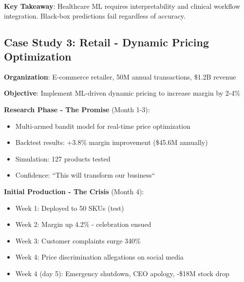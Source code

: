 \textbf{Key Takeaway}: Healthcare ML requires interpretability and clinical workflow integration. Black-box predictions fail regardless of accuracy.

\subsection{Case Study 3: Retail - Dynamic Pricing Optimization}

\textbf{Organization}: E-commerce retailer, 50M annual transactions, \$1.2B revenue

\textbf{Objective}: Implement ML-driven dynamic pricing to increase margin by 2-4\%

\textbf{Research Phase - The Promise} (Month 1-3):
\begin{itemize}
    \item Multi-armed bandit model for real-time price optimization
    \item Backtest results: +3.8\% margin improvement (\$45.6M annually)
    \item Simulation: 127 products tested
    \item Confidence: ``This will transform our business``
\end{itemize}

\textbf{Initial Production - The Crisis} (Month 4):
\begin{itemize}
    \item Week 1: Deployed to 50 SKUs (test)
    \item Week 2: Margin up 4.2\% - celebration ensued
    \item Week 3: Customer complaints surge 340\%
    \item Week 4: Price discrimination allegations on social media
    \item Week 4 (day 5): Emergency shutdown, CEO apology, -\$18M stock drop
\end{itemize}

